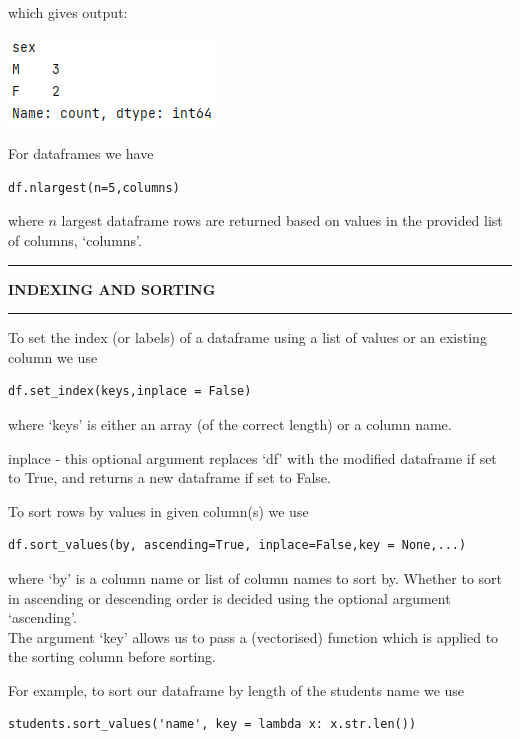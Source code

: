 \documentclass[8pt]{extarticle}
\newcommand{\heading}[1]{%
    \noindent
    \rule{\linewidth}{0.4pt}
    \begin{center}
        \vspace{-1ex}
        \textbf{#1}        
        \vspace{-2.5ex}
    \end{center}
    \rule{\linewidth}{0.4pt}
}
\begin{document}
\begin{multicols}{4}
which gives output:

\includegraphics[scale = 0.6]{images/series_output.png}

\begin{tcolorbox}[width=\columnwidth, colback=white!95!black]
For dataframes we have \begin{lstlisting}[style=Python]
df.nlargest(n=5,columns)\end{lstlisting} where $n$ largest dataframe rows are returned based on values in the provided list of columns, `columns'. 
\end{tcolorbox}


\heading{INDEXING AND SORTING}

To set the index (or labels) of a dataframe using a list of values or an existing column we use

\begin{lstlisting}[style=Python]
df.set_index(keys,inplace = False)
\end{lstlisting}
where `keys' is either an array (of the correct length) or a column name.

\begin{tcolorbox}[width=\columnwidth, colback=white!95!black]
inplace - this optional argument replaces `df' with the modified dataframe if set to True, and returns a new dataframe if set to False. 
\end{tcolorbox}

To sort rows by values in given column(s) we use

\begin{lstlisting}[style=Python]
df.sort_values(by, ascending=True, inplace=False,key = None,...)
\end{lstlisting}
where `by' is a column name or list of column names to sort by. Whether to sort in ascending or descending order is decided using the optional argument `ascending'.\\

The argument `key' allows us to pass a (vectorised) function which is applied to the sorting column before sorting. 

For example, to sort our dataframe by length of the students name we use

\begin{lstlisting}[style=Python]
students.sort_values('name', key = lambda x: x.str.len())
\end{lstlisting}


\end{multicols}
\end{document}
